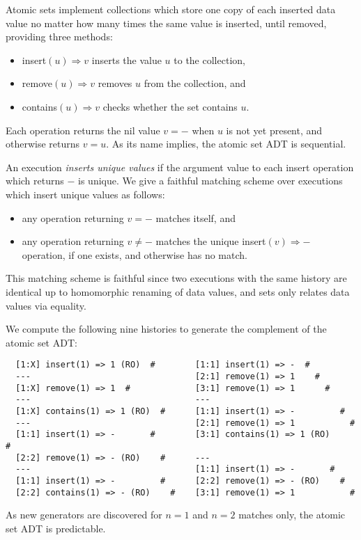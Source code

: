 Atomic sets implement collections which store one copy of each inserted data
value no matter how many times the same value is inserted, until removed,
providing three methods:
\begin{itemize}

  \item insert$(u) \Rightarrow v$ inserts the value $u$ to the collection,

  \item remove$(u) \Rightarrow v$ removes $u$ from the collection, and

  \item contains$(u) \Rightarrow v$ checks whether the set contains $u$.

\end{itemize}
Each operation returns the nil value $v = -$ when $u$ is not yet
present, and otherwise returns $v = u$. As its name implies, the atomic set
ADT is sequential.

An execution \emph{inserts unique values} if the argument value to each insert
operation which returns $-$ is unique. We give a faithful matching
scheme over executions which insert unique values as follows:
\begin{itemize}

  \item any operation returning $v = -$ matches itself, and

  \item any operation returning $v \neq -$ matches the unique
  insert$(v) \Rightarrow -$ operation, if one exists, and otherwise
  has no match.

\end{itemize}
This matching scheme is faithful since two executions with the same history are
identical up to homomorphic renaming of data values, and sets only relates data
values via equality.

We compute the following nine histories to generate the complement of the
atomic set ADT:
\begin{verbatim}
  [1:X] insert(1) => 1 (RO)  #        [1:1] insert(1) => -  #
  ---                                 [2:1] remove(1) => 1    #
  [1:X] remove(1) => 1  #             [3:1] remove(1) => 1      #
  ---                                 ---
  [1:X] contains(1) => 1 (RO)  #      [1:1] insert(1) => -         #
  ---                                 [2:1] remove(1) => 1           #
  [1:1] insert(1) => -       #        [3:1] contains(1) => 1 (RO)      #
  [2:2] remove(1) => - (RO)    #      ---
  ---                                 [1:1] insert(1) => -       #
  [1:1] insert(1) => -         #      [2:2] remove(1) => - (RO)    #
  [2:2] contains(1) => - (RO)    #    [3:1] remove(1) => 1           #
\end{verbatim}
As new generators are discovered for $n=1$ and $n=2$ matches only, the atomic
set ADT is predictable.

